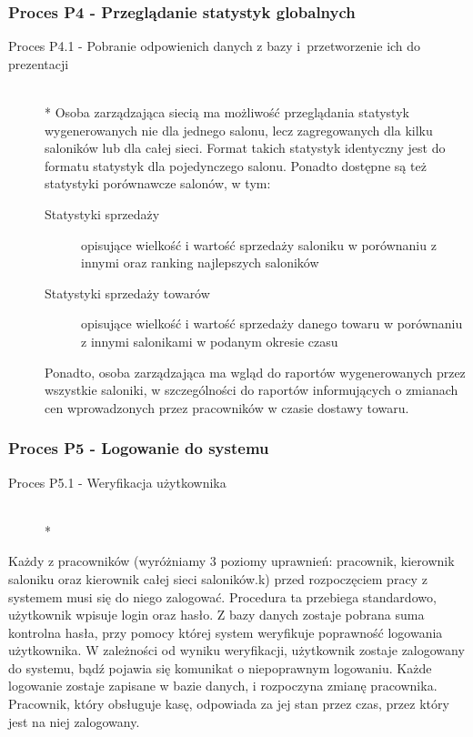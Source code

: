 \subsubsection{Proces P4 - Przeglądanie statystyk globalnych}
\begin{description}
\item[Proces P4.1 - Pobranie odpowienich danych z bazy i~przetworzenie ich do prezentacji] ~\\*
Osoba zarządzająca siecią ma możliwość przeglądania statystyk wygenerowanych nie dla jednego salonu, lecz zagregowanych dla kilku saloników lub dla całej sieci. Format takich statystyk identyczny jest do formatu statystyk dla pojedynczego salonu. Ponadto dostępne są też statystyki porównawcze salonów, w tym:
\begin{description}
\item[Statystyki sprzedaży] opisujące wielkość i wartość sprzedaży saloniku w porównaniu z innymi oraz ranking najlepszych saloników
\item[Statystyki sprzedaży towarów] opisujące wielkość i wartość sprzedaży danego towaru w porównaniu z innymi salonikami w podanym okresie czasu
\end{description}
Ponadto, osoba zarządzająca ma wgląd do raportów wygenerowanych przez wszystkie saloniki, w szczególności do raportów informujących o zmianach cen wprowadzonych przez pracowników w czasie dostawy towaru.
\end{description}
\subsubsection{Proces P5 - Logowanie do systemu}
\begin{description}
\item[Proces P5.1 - Weryfikacja użytkownika] ~\\*
\end{description}
Każdy z pracowników (wyróżniamy 3 poziomy uprawnień: pracownik, kierownik saloniku oraz kierownik całej sieci saloników.k) przed rozpoczęciem pracy z systemem musi się do niego zalogować. Procedura ta przebiega standardowo, użytkownik wpisuje login oraz hasło. Z bazy danych zostaje pobrana suma kontrolna hasła, przy pomocy której system weryfikuje poprawność logowania użytkownika. W zależności od wyniku weryfikacji, użytkownik zostaje zalogowany do systemu, bądź pojawia się komunikat o niepoprawnym logowaniu. Każde logowanie zostaje zapisane w bazie danych, i rozpoczyna zmianę pracownika. Pracownik, który obsługuje kasę, odpowiada za jej stan przez czas, przez który jest na niej zalogowany.
